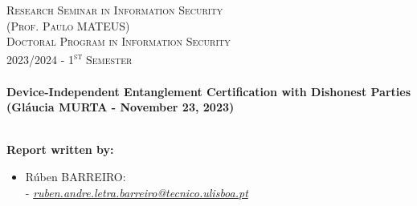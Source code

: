 \documentclass[12pt]{article}
\begin{document}
\begin{titlepage}
\begin{figure}[H]
\begin{minipage}{.5\textwidth}
        \end{minipage}
    \end{figure}
    \vspace{-1cm}
    \textsc{\Large Research Seminar in Information Security}\\[0.5cm] %
    \textsc{(Prof. Paulo \uppercase{Mateus})}\\[0.5cm]
    \textsc{Doctoral Program in Information Security}\\[0.5cm] %
    \textsc{\large 2023/2024 - 1\textsuperscript{st} Semester}\\[0.5cm] %
    
    
    \HRule \\[0.3cm]
        { \huge \bfseries Device-Independent Entanglement Certification with Dishonest Parties \\ \vspace{0.5cm} \Large (Gl\'{a}ucia \textsc{\uppercase{Murta}} - November 23, 2023)}\\[0.4cm] %
    \HRule \\[1cm]
     
    
    \begin{minipage}{0.75\textwidth}
    
        \begin{flushleft} \large
            \textbf{Report written by:}\\
            \begin{itemize}
                \vspace{-0.1cm}
                \item \normalsize{Rúben \textsc{\uppercase{Barreiro}}:\\
                - \href{mailto:ruben.andre.letra.barreiro@tecnico.ulisboa.pt}{\emph{ruben.andre.letra.barreiro@tecnico.ulisboa.pt}}}
            \end{itemize}
        \end{flushleft}
    

\end{minipage}
\end{titlepage}
\end{document}
